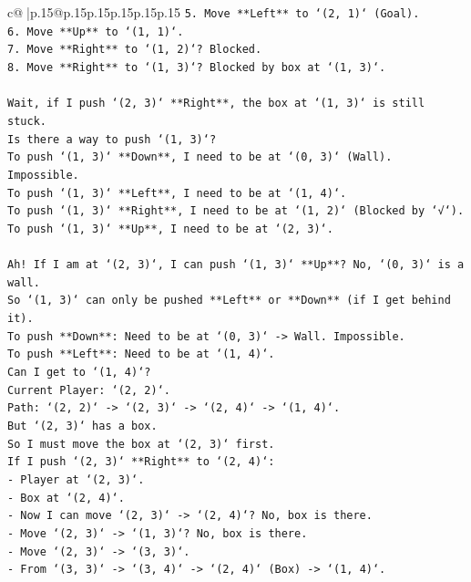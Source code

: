 \documentclass{article}
\begin{document}
{\begin{supertabular}{c@{$\;$}|p{.15\linewidth}@{}p{.15\linewidth}p{.15\linewidth}p{.15\linewidth}p{.15\linewidth}p{.15\linewidth}}
{{{\texttt{5. Move **Left** to `(2, 1)` (Goal).} \\
\texttt{6. Move **Up** to `(1, 1)`.} \\
\texttt{7. Move **Right** to `(1, 2)`? Blocked.} \\
\texttt{8. Move **Right** to `(1, 3)`? Blocked by box at `(1, 3)`.} \\
\\ 
\texttt{Wait, if I push `(2, 3)` **Right**, the box at `(1, 3)` is still stuck.} \\
\texttt{Is there a way to push `(1, 3)`?} \\
\texttt{To push `(1, 3)` **Down**, I need to be at `(0, 3)` (Wall). Impossible.} \\
\texttt{To push `(1, 3)` **Left**, I need to be at `(1, 4)`.} \\
\texttt{To push `(1, 3)` **Right**, I need to be at `(1, 2)` (Blocked by `√`).} \\
\texttt{To push `(1, 3)` **Up**, I need to be at `(2, 3)`.} \\
\\ 
\texttt{Ah! If I am at `(2, 3)`, I can push `(1, 3)` **Up**? No, `(0, 3)` is a wall.} \\
\texttt{So `(1, 3)` can only be pushed **Left** or **Down** (if I get behind it).} \\
\texttt{To push **Down**: Need to be at `(0, 3)` {-}> Wall. Impossible.} \\
\texttt{To push **Left**: Need to be at `(1, 4)`.} \\
\texttt{Can I get to `(1, 4)`?} \\
\texttt{Current Player: `(2, 2)`.} \\
\texttt{Path: `(2, 2)` {-}> `(2, 3)` {-}> `(2, 4)` {-}> `(1, 4)`.} \\
\texttt{But `(2, 3)` has a box.} \\
\texttt{So I must move the box at `(2, 3)` first.} \\
\texttt{If I push `(2, 3)` **Right** to `(2, 4)`:} \\
\texttt{{-} Player at `(2, 3)`.} \\
\texttt{{-} Box at `(2, 4)`.} \\
\texttt{{-} Now I can move `(2, 3)` {-}> `(2, 4)`? No, box is there.} \\
\texttt{{-} Move `(2, 3)` {-}> `(1, 3)`? No, box is there.} \\
\texttt{{-} Move `(2, 3)` {-}> `(3, 3)`.} \\
\texttt{{-} From `(3, 3)` {-}> `(3, 4)` {-}> `(2, 4)` (Box) {-}> `(1, 4)`.} \\
}}}
\end{supertabular}}
\end{document}
